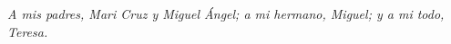 \thispagestyle{empty}
\clearpage
\begin{center}
     \thispagestyle{empty}
    \vspace*{30mm}
  \textit{A mis padres, Mari Cruz y Miguel Ángel; a mi hermano, Miguel; y a mi todo, Teresa.}
    \vspace*{\fill}   
\end{center}


\clearpage
\thispagestyle{empty}



\newpage
\vspace*{120pt}
\thispagestyle{empty}
\newpage
\thispagestyle{empty}



